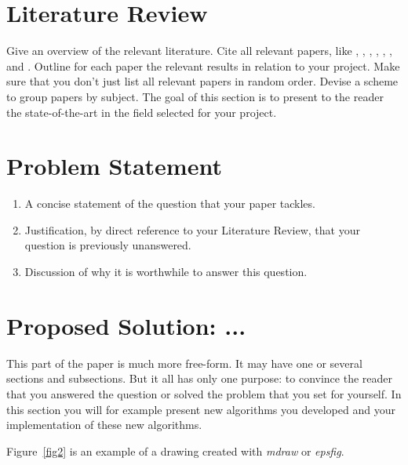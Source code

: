 \documentclass[11pt]{article}       %
\begin{document}
\section{Literature Review} \label{litrev}

Give an overview of the relevant literature. Cite all relevant
papers, like \cite{DEL07}, \cite{PD07}, \cite{DER07}, \cite{LDR07},
\cite{DLX06}, \cite{CDE06}, and \cite{DFL06}. Outline for each paper
the relevant results in relation to your project. Make sure that you
don't just list all relevant papers in random order. Devise a scheme
to group papers by subject. The goal of this section is to present
to the reader the state-of-the-art in the field selected for your
project.

\section{Problem Statement} \label{problemStatement}

\begin{enumerate}
\item A concise statement of the question that your paper tackles.
\item Justification, by direct reference to your Literature Review, that your question is previously unanswered.
\item Discussion of why it is worthwhile to answer this question.
\end{enumerate}

\section{Proposed Solution: ...} \label{proposedSolution}

This part of the paper is much more free-form. It may have one or several sections and subsections. But it all has only one purpose: to convince the reader that you answered the question or solved the problem that you set for yourself. In this section you will for example present new algorithms you developed and your implementation of these new algorithms.

 Figure~\ref{fig2} is an example
of a drawing created with {\em mdraw} or {\em epsfig}.
\end{document}
